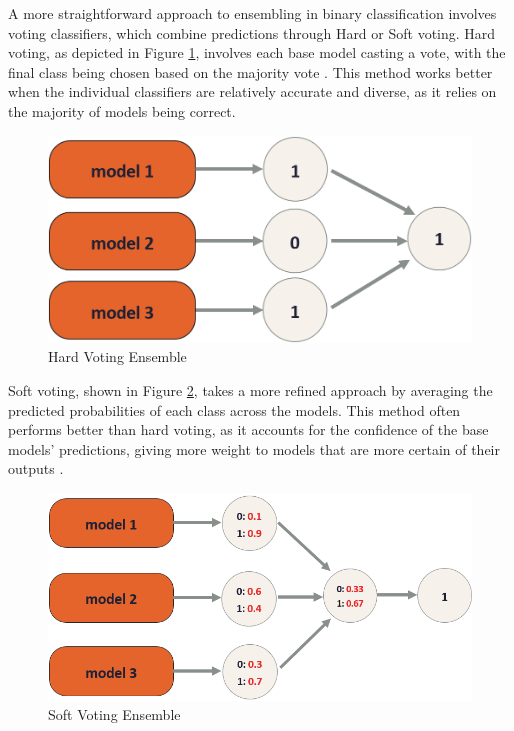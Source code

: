 \documentclass{Configuration_Files/PoliMi3i_thesis}
\begin{document}
A more straightforward approach to ensembling in binary classification involves voting classifiers, which combine predictions through Hard or Soft voting. Hard voting, as depicted in Figure \ref{ensemble_hard_voting}, involves each base model casting a vote, with the final class being chosen based on the majority vote \cite{kuncheva2004combining}. This method works better when the individual classifiers are relatively accurate and diverse, as it relies on the majority of models being correct.

\begin{figure}[h!] 
\centering 
\includegraphics[width=0.64\linewidth, height=0.20\textheight]{Images/ensemble_hard_voting.png} 
\caption{Hard Voting Ensemble} 
\label{ensemble_hard_voting} 
\end{figure} 
\FloatBarrier

Soft voting, shown in Figure \ref{ensemble_soft_voting}, takes a more refined approach by averaging the predicted probabilities of each class across the models. This method often performs better than hard voting, as it accounts for the confidence of the base models' predictions, giving more weight to models that are more certain of their outputs \cite{zhou2012ensemble}.

\begin{figure}[h!] 
\centering 
\includegraphics[width=0.73\linewidth, height=0.25\textheight]{Images/ensemble_soft_voting.png} 
\caption{Soft Voting Ensemble} 
\label{ensemble_soft_voting} 
\end{figure} 
\FloatBarrier
\end{document}
